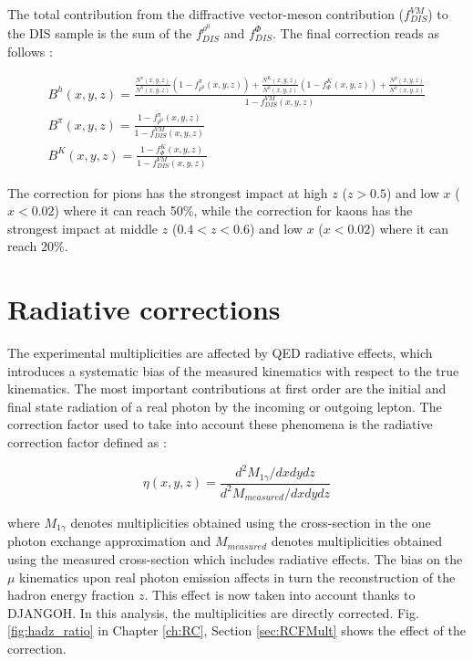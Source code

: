 The total contribution from the diffractive vector-meson contribution ($f^{VM}_{DIS}$) to the DIS sample is the sum of the $f^{\rho^0}_{DIS}$ and $f^{\Phi}_{DIS}$. The final correction reads as follows :

\begin{equation}
  \begin{split}
  B^h(x,y,z) = \frac{ \frac{N^{\pi}(x,y,z)}{N^h(x,y,z)}\left (1-f^{\pi}_{\rho^0}(x,y,z)\right )
                   + \frac{N^K(x,y,z)}{N^h(x,y,z)}\left (1-f^{K}_{\Phi}(x,y,z)\right ) + \frac{N^p(x,y,z)}{N^h(x,y,z)} }{1-f^{VM}_{DIS}(x,y,z)} \\
  B^{\pi}(x,y,z) = \frac{1-f^{\pi}_{\rho^0}(x,y,z)}{1-f^{VM}_{DIS}(x,y,z)} \\
  B^K(x,y,z) = \frac{1-f^{K}_{\Phi}(x,y,z)}{1-f^{VM}_{DIS}(x,y,z)}
  \end{split}
\end{equation}

The correction for pions has the strongest impact at high $z$ ($z>0.5$) and low $x$ ($x<0.02$) where it can reach 50\%, while the correction for kaons has the strongest impact at middle $z$ ($0.4<z<0.6$) and low $x$ ($x<0.02$) where it can reach 20\%.

\section{Radiative corrections}

The experimental multiplicities are affected by QED radiative effects, which introduces a systematic bias of the measured kinematics with respect to the true kinematics. The most important contributions at first order are the initial and final state radiation of a real photon by the incoming or outgoing lepton. The correction factor used to take into account these phenomena is the radiative correction factor defined as :

\begin{equation}
	\eta(x,y,z) = \frac{d^2 M_{1\gamma}/dxdydz}{d^2 M_{measured}/dxdydz}
\end{equation}

where $M_{1\gamma}$ denotes multiplicities obtained using the cross-section in the one photon exchange approximation and $M_{measured}$ denotes multiplicities obtained using the measured cross-section which includes radiative effects. The bias on the $\mu$ kinematics upon real photon emission affects in turn the reconstruction of the hadron energy fraction $z$. This effect is now taken into account thanks to DJANGOH. In this analysis, the multiplicities are directly corrected. Fig.\ref{fig:hadz_ratio} in Chapter \ref{ch:RC}, Section \ref{sec:RCFMult} shows the effect of the correction.

